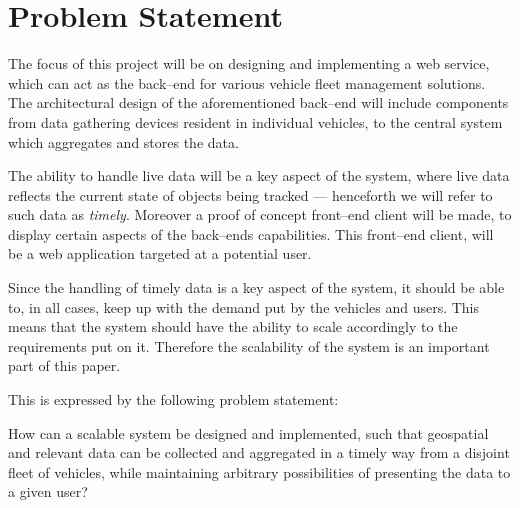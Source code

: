 \section{Problem Statement}\label{sec:problem_statement}

The focus of this project will be on designing and implementing a web service,
which can act as the back--end for various vehicle fleet management solutions.
The architectural design of the aforementioned back--end will include components
from data gathering devices resident in individual vehicles,
to the central system which aggregates and stores the data.

The ability to handle live data will be a key aspect of the system,
where live data reflects the current state of objects being tracked
--- henceforth we will refer to such data as \textit{timely}.
Moreover a proof of concept front--end client will be made,
to display certain aspects of the back--ends capabilities.
This front--end client, will be a web application targeted at a potential user.

Since the handling of timely data is a key aspect of the system,
it should be able to, in all cases, keep up with the demand put by the vehicles and users.
This means that the system should have the ability to scale accordingly to the requirements put on it.
Therefore the scalability of the system is an important part of this paper.

\bigskip\noindent
This is expressed by the following problem statement:

\medskip
{\addtolength{\leftskip}{10mm}\addtolength{\rightskip}{10mm}\noindent\hrulefill\it

\noindent How can a scalable system be designed and implemented,
such that geospatial and relevant data can be collected and aggregated in a timely way from a disjoint fleet of vehicles,
while maintaining arbitrary possibilities of presenting the data to a given user?

\noindent\hrulefill

}
